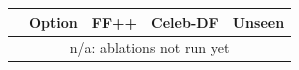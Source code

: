 \begin{tabular}{llccc}
\toprule
& Option & FF++ & Celeb-DF & Unseen \\
\midrule
\multicolumn{5}{c}{n/a: ablations not run yet} \\
\bottomrule
\end{tabular}
